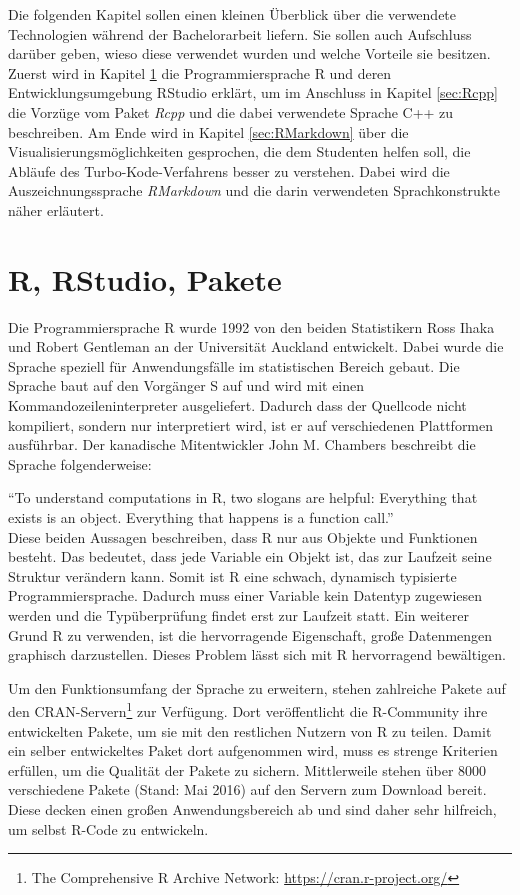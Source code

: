 Die folgenden Kapitel sollen einen kleinen Überblick über die verwendete Technologien während der Bachelorarbeit liefern. Sie sollen auch Aufschluss darüber geben, wieso diese verwendet wurden und welche Vorteile sie besitzen. Zuerst wird in Kapitel \ref{sec:R} die Programmiersprache R und deren Entwicklungsumgebung RStudio erklärt, um im Anschluss in Kapitel \ref{sec:Rcpp} die Vorzüge vom Paket \emph{Rcpp} und die dabei verwendete Sprache C++ zu beschreiben. Am Ende wird in Kapitel \ref{sec:RMarkdown} über die Visualisierungsmöglichkeiten gesprochen, die dem Studenten helfen soll, die Abläufe des Turbo-Kode-Verfahrens besser zu verstehen. Dabei wird die Auszeichnungssprache \emph{RMarkdown} und die darin verwendeten Sprachkonstrukte näher erläutert.

\section{R, RStudio, Pakete}
\label{sec:R}
Die Programmiersprache R wurde 1992 von den beiden Statistikern  Ross Ihaka und Robert Gentleman an der Universität Auckland entwickelt. Dabei wurde die Sprache speziell für Anwendungsfälle im statistischen Bereich gebaut. Die Sprache baut auf den Vorgänger S auf und wird mit einen Kommandozeileninterpreter ausgeliefert. Dadurch dass der Quellcode nicht kompiliert, sondern nur interpretiert wird, ist er auf verschiedenen Plattformen ausführbar. Der kanadische Mitentwickler John M. Chambers beschreibt die Sprache folgenderweise:

\enquote{To understand computations in R, two slogans are helpful: Everything that exists is an object. Everything that happens is a function call.} \cite{chambers2014object}\\

Diese beiden Aussagen beschreiben, dass R nur aus Objekte und Funktionen besteht. Das bedeutet, dass jede Variable ein Objekt ist, das zur Laufzeit seine Struktur verändern kann. Somit ist R eine schwach, dynamisch typisierte Programmiersprache. Dadurch muss einer Variable kein Datentyp zugewiesen werden und die Typüberprüfung findet erst zur Laufzeit statt. Ein weiterer Grund R zu verwenden, ist die hervorragende Eigenschaft, große Datenmengen graphisch darzustellen. Dieses Problem lässt sich mit R hervorragend bewältigen.

Um den Funktionsumfang der Sprache zu erweitern, stehen zahlreiche Pakete auf den CRAN-Servern\footnote{The Comprehensive R Archive Network: \url{https://cran.r-project.org/}} zur Verfügung. Dort veröffentlicht die R-Community ihre entwickelten Pakete, um sie mit den restlichen Nutzern von R zu teilen. Damit ein selber entwickeltes Paket dort aufgenommen wird, muss es strenge Kriterien erfüllen, um die Qualität der Pakete zu sichern. Mittlerweile stehen über 8000 verschiedene Pakete (Stand: Mai 2016) auf den Servern zum Download bereit. Diese decken einen großen Anwendungsbereich ab und sind daher sehr hilfreich, um selbst R-Code zu entwickeln\cite{rmanual}.

